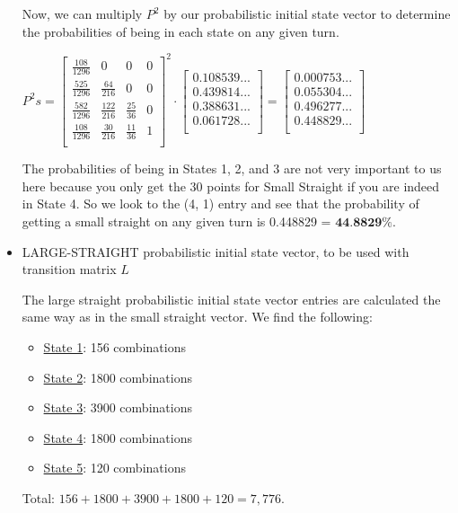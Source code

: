 \documentclass[12pt,a4paper]{article}
\begin{document}
\begin{itemize}
\clearpage

Now, we can multiply $P^2$ by our probabilistic initial state vector to determine the probabilities of being in each state on any given turn.

$P^2s = {\begin{bmatrix}
\frac{108}{1296} & 0 & 0 & 0 \\[6pt]
\frac{525}{1296} & \frac{64}{216} & 0 & 0 \\[6pt]
\frac{582}{1296} & \frac{122}{216} & \frac{25}{36} & 0\\[6pt]
\frac{108}{1296} & \frac{30}{216} & \frac{11}{36} & 1 \\[6pt]
\end{bmatrix}}^2 \cdot \begin{bmatrix}
0.108539... \\
0.439814... \\
0.388631... \\
0.061728... \\
\end{bmatrix} = \begin{bmatrix}
0.000753... \\
0.055304... \\
0.496277... \\
0.448829... \\
\end{bmatrix}$

The probabilities of being in States 1, 2, and 3 are not very important to us here because you only get the 30 points for Small Straight if you are indeed in State 4. So we look to the (4, 1) entry and see that the probability of getting a small straight on any given turn is 0.448829 = $\textbf{44.8829\%}$.

    \item LARGE-STRAIGHT probabilistic initial state vector, to be used with transition matrix $L$

    The large straight probabilistic initial state vector entries are calculated the same way as in the small straight vector. We find the following:
    \begin{itemize}
        \item \underline{State 1}: 156 combinations
        \item \underline{State 2}: 1800 combinations
        \item \underline{State 3}: 3900 combinations
        \item \underline{State 4}: 1800 combinations
        \item \underline{State 5}: 120 combinations
    \end{itemize}
    Total: $156 + 1800 + 3900 + 1800 + 120 = 7,776$.


\end{itemize}
\end{document}
